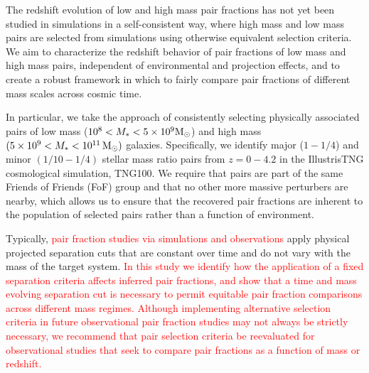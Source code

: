 \documentclass[twocolumn]{aastex631}
\newcommand{\add}[1]{\textcolor{red}{#1}}
\begin{document}
    The redshift evolution of low and high mass pair fractions has not yet been studied in simulations in a self-consistent way, where high mass and low mass pairs are selected from simulations using otherwise equivalent selection criteria. 
    We aim to characterize the redshift behavior of pair fractions of low mass and high mass pairs, independent of environmental and projection effects, and to create a robust framework in which to fairly compare pair fractions of different mass scales across cosmic time. 

    In particular, we take the approach of consistently selecting physically associated pairs of low mass ($10^8<M_*<5\times10^9\mathrm{M}_\odot$) and high mass $(5\times10^9<M_*<10^{11}\,\mathrm{M}_\odot)$ galaxies. 
    Specifically, we identify major ($1-1/4$) and minor $(1/10-1/4)$ stellar mass ratio pairs from $z=0-4.2$ in the IllustrisTNG cosmological simulation, TNG100. 
    We require that pairs are part of the same Friends of Friends (FoF) group and that no other more massive perturbers are nearby, which allows us to ensure that the recovered pair fractions are inherent to the population of selected pairs rather than a function of environment. 

    Typically, 
    \add{pair fraction studies via simulations and observations}
    apply physical projected separation cuts that are constant over time and do not vary with the mass of the target system. 
    \add{In this study we identify how the application of a fixed separation criteria affects inferred pair fractions, and show that a time and mass evolving separation cut is necessary to permit equitable pair fraction comparisons across different mass regimes.} 
    \add{Although implementing alternative selection criteria in future observational pair fraction studies may not always be strictly necessary, we recommend that pair selection criteria be reevaluated for observational studies that seek to compare pair fractions as a function of mass or redshift.}
\end{document}
